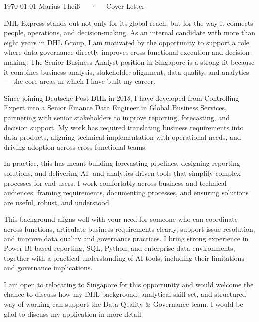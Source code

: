 \documentclass[11pt, a4paper]{awesome-cv}
\begin{document}
\makecvheader[R]

\makecvfooter
  {\today}
  {Marius Theiß~~~·~~~Cover Letter}
  {}

\makelettertitle

\begin{cvletter}

  {DHL Express stands out not only for its global reach, but for the way it connects people,
  operations, and decision-making. As an internal candidate with more than eight years in DHL Group,
  I am motivated by the opportunity to support a role where data governance directly improves
  cross-functional execution and decision-making. The Senior Business Analyst position in Singapore
  is a strong fit because it combines business analysis, stakeholder alignment, data quality,
  and analytics --- the core areas in which I have built my career.}

  {Since joining Deutsche Post DHL in 2018, I have developed from Controlling Expert into a
  Senior Finance Data Engineer in Global Business Services, partnering with senior stakeholders
  to improve reporting, forecasting, and decision support. My work has required translating business
  requirements into data products, aligning technical implementation with operational needs,
  and driving adoption across cross-functional teams.

  In practice, this has meant building forecasting pipelines, designing reporting solutions,
  and delivering AI- and analytics-driven tools that simplify complex processes for end users.
  I work comfortably across business and technical audiences: framing requirements, documenting
  processes, and ensuring solutions are useful, robust, and understood.

  This background aligns well with your need for someone who can coordinate across functions,
  articulate business requirements clearly, support issue resolution, and improve data quality and
  governance practices. I bring strong experience in Power BI-based reporting, SQL, Python,
  and enterprise data environments, together with a practical understanding of AI tools,
  including their limitations and governance implications.}

  {I am open to relocating to Singapore for this opportunity and would welcome the chance to discuss
  how my DHL background, analytical skill set, and structured way of working can support the Data
  Quality \& Governance team. I would be glad to discuss my application in more detail.}

\end{cvletter}


\makeletterclosing
\end{document}
